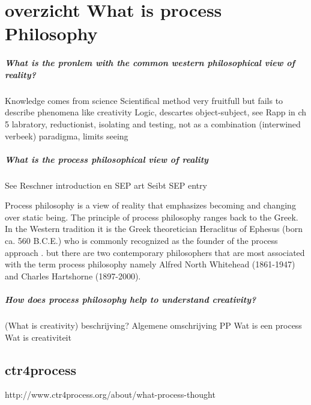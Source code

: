\documentclass[a4paper]{Thesis}
\begin{document}
	


\chapter{overzicht What is process Philosophy}

\paragraph{What is the pronlem with the common western philosophical view of reality?}
Knowledge comes from science
Scientifical method very fruitfull but fails to describe phenomena like creativity
Logic, descartes object-subject, see Rapp in ch 5
labratory, reductionist, isolating and testing, not as a combination (interwined verbeek)
paradigma, limits seeing

\paragraph{What is the process philosophical view of reality}
See Reschner introduction en SEP art \cite{Rescher-2012-sep}
Seibt SEP entry \cite{Seibt-2013-sep}


Process philosophy is a view of reality that emphasizes becoming and changing over static being. The principle of process philosophy ranges back to the Greek.
In the Western tradition it is the Greek theoretician Heraclitus of Ephesus (born ca. 560 B.C.E.) who is commonly recognized as the founder of the process approach \cite{Seibt-2013-sep}. 
but there are two contemporary philosophers that are most associated with the term process philosophy namely Alfred North Whitehead (1861-1947) and Charles Hartshorne (1897-2000).



\paragraph{How does process philosophy help to understand creativity?}

\paragragph(What is creativity)
beschrijving?
Algemene omschrijving PP
Wat is een process
Wat is creativiteit





\section{ctr4process}
http://www.ctr4process.org/about/what-process-thought
\end{document}
